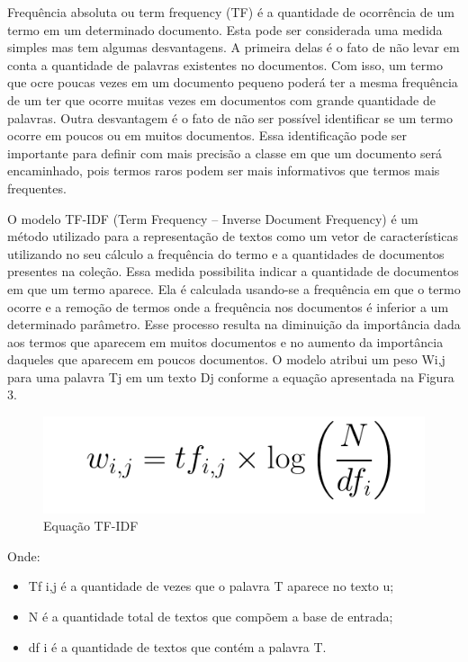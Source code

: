 \documentclass[conference]{IEEEtran}
\begin{document}
Frequência absoluta ou term frequency (TF) \cite{tfidf} é a quantidade de ocorrência de um
  termo em um determinado documento. Esta pode ser considerada uma medida simples
  mas tem algumas desvantagens. A primeira delas é o fato de não levar em conta a quantidade de palavras existentes no documentos. Com isso, um termo que ocre poucas
  vezes em um documento pequeno poderá ter a mesma frequência de um ter que ocorre
  muitas vezes em documentos com grande quantidade de palavras. Outra desvantagem é
  o fato de não ser possível identificar se um termo ocorre em poucos ou em muitos documentos.  Essa identificação pode ser importante para definir com mais precisão a classe em que um documento será encaminhado, pois termos raros podem ser mais informativos que termos mais frequentes.
 
 O modelo TF-IDF (Term Frequency – Inverse Document Frequency) \cite{tfidf3} é um método utilizado para a representação de textos como um vetor de características utilizando no seu cálculo a frequência do
  termo e a quantidades de documentos presentes na coleção.  \cite{tfidf1} \cite{tfidf2}Essa medida possibilita
  indicar a quantidade de documentos em que um termo aparece. Ela é calculada usando-se a frequência em que o termo ocorre e a remoção de termos onde a frequência nos documentos é inferior a um determinado parâmetro. Esse processo resulta na diminuição da importância dada aos termos que aparecem em muitos documentos e no aumento da
  importância daqueles que aparecem em poucos documentos. O modelo atribui um peso Wi,j para uma palavra Tj em um texto Dj conforme a equação apresentada na Figura 3.


	\begin{figure}[htbp]
	\centerline{\includegraphics[scale=.5]{imagens/tfidf.png}}
	\caption{Equação TF-IDF}
	\label{fig}
	\end{figure}
     Onde:
\begin{itemize}
\item  Tf i,j é a quantidade de vezes que o palavra T aparece no texto u;
\item  N é a quantidade total de textos que compõem a base de entrada;
\item  df i é a quantidade de textos que contém a palavra T.
\end{itemize}
\end{document}
